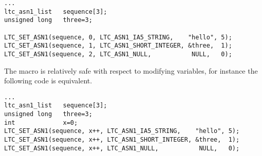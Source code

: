 \documentclass[synpaper]{book}
\begin{document}
\begin{small}
\begin{verbatim}
...
ltc_asn1_list   sequence[3];
unsigned long   three=3;

LTC_SET_ASN1(sequence, 0, LTC_ASN1_IA5_STRING,    "hello", 5);
LTC_SET_ASN1(sequence, 1, LTC_ASN1_SHORT_INTEGER, &three,  1);
LTC_SET_ASN1(sequence, 2, LTC_ASN1_NULL,           NULL,   0);
\end{verbatim}
\end{small}

The macro is relatively safe with respect to modifying variables, for instance the following code is equivalent.

\begin{small}
\begin{verbatim}
...
ltc_asn1_list   sequence[3];
unsigned long   three=3;
int             x=0;
LTC_SET_ASN1(sequence, x++, LTC_ASN1_IA5_STRING,    "hello", 5);
LTC_SET_ASN1(sequence, x++, LTC_ASN1_SHORT_INTEGER, &three,  1);
LTC_SET_ASN1(sequence, x++, LTC_ASN1_NULL,           NULL,   0);
\end{verbatim}
\end{small}
\end{document}
